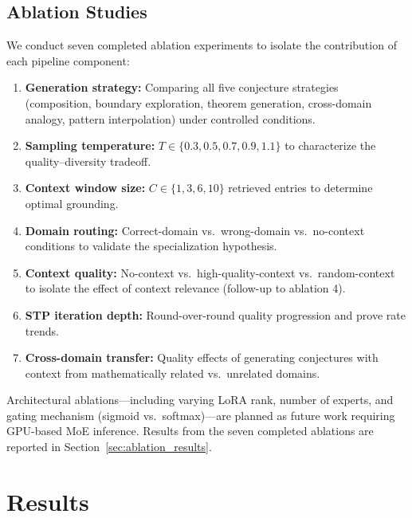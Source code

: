 \documentclass[11pt,a4paper]{article}
\begin{document}
\subsection{Ablation Studies}

We conduct seven completed ablation experiments to isolate the contribution of each pipeline component:

\begin{enumerate}
    \item \textbf{Generation strategy:} Comparing all five conjecture strategies (composition, boundary exploration, theorem generation, cross-domain analogy, pattern interpolation) under controlled conditions.
    \item \textbf{Sampling temperature:} $T \in \{0.3, 0.5, 0.7, 0.9, 1.1\}$ to characterize the quality--diversity tradeoff.
    \item \textbf{Context window size:} $C \in \{1, 3, 6, 10\}$ retrieved entries to determine optimal grounding.
    \item \textbf{Domain routing:} Correct-domain vs.\ wrong-domain vs.\ no-context conditions to validate the specialization hypothesis.
    \item \textbf{Context quality:} No-context vs.\ high-quality-context vs.\ random-context to isolate the effect of context relevance (follow-up to ablation 4).
    \item \textbf{STP iteration depth:} Round-over-round quality progression and prove rate trends.
    \item \textbf{Cross-domain transfer:} Quality effects of generating conjectures with context from mathematically related vs.\ unrelated domains.
\end{enumerate}

Architectural ablations---including varying LoRA rank, number of experts, and gating mechanism (sigmoid vs.\ softmax)---are planned as future work requiring GPU-based MoE inference. Results from the seven completed ablations are reported in Section~\ref{sec:ablation_results}.


\section{Results}
\label{sec:results}
\end{document}
